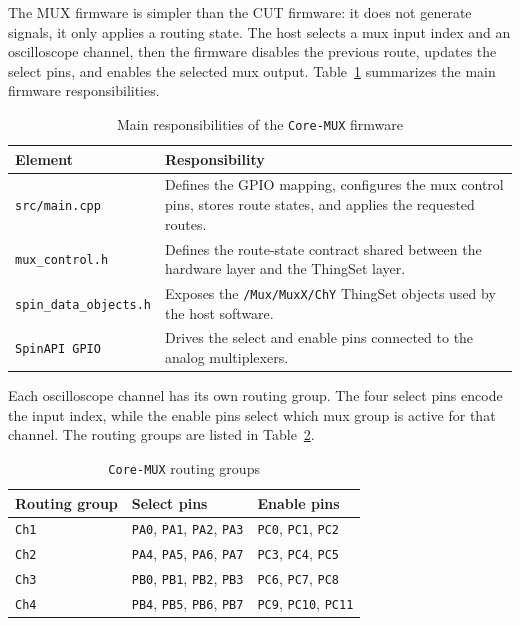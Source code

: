 The MUX firmware is simpler than the CUT firmware: it does
not generate signals, it only applies a routing state. The host selects a
mux input index and an oscilloscope channel, then the firmware disables
the previous route, updates the select pins, and enables the selected
mux output. Table~\ref{tab:core_mux_responsibilities} summarizes the
main firmware responsibilities.

\begin{table}[H]
\centering
\caption{Main responsibilities of the \texttt{Core-MUX} firmware}
\label{tab:core_mux_responsibilities}
\small
\begin{tabularx}{\textwidth}{|p{4.5cm}|X|}
\hline
\textbf{Element} & \textbf{Responsibility} \\ \hline
\texttt{src/main.cpp} & Defines the GPIO mapping, configures the mux control pins, stores route states, and applies the requested routes. \\ \hline
\texttt{mux\_control.h} & Defines the route-state contract shared between the hardware layer and the ThingSet layer. \\ \hline
\texttt{spin\_data\_objects.h} & Exposes the \texttt{/Mux/MuxX/ChY} ThingSet objects used by the host software. \\ \hline
\texttt{SpinAPI GPIO} & Drives the select and enable pins connected to the analog multiplexers. \\ \hline
\end{tabularx}
\normalsize
\end{table}

Each oscilloscope channel has its own routing group. The four select
pins encode the input index, while the enable pins select which mux
group is active for that channel. The routing groups are listed in
Table~\ref{tab:core_mux_routing_groups}.

\begin{table}[H]
\centering
\caption{\texttt{Core-MUX} routing groups}
\label{tab:core_mux_routing_groups}
\small
\begin{tabularx}{\textwidth}{|X|X|X|}
\hline
\textbf{Routing group} & \textbf{Select pins} & \textbf{Enable pins} \\ \hline
\texttt{Ch1} & \texttt{PA0}, \texttt{PA1}, \texttt{PA2}, \texttt{PA3} & \texttt{PC0}, \texttt{PC1}, \texttt{PC2} \\ \hline
\texttt{Ch2} & \texttt{PA4}, \texttt{PA5}, \texttt{PA6}, \texttt{PA7} & \texttt{PC3}, \texttt{PC4}, \texttt{PC5} \\ \hline
\texttt{Ch3} & \texttt{PB0}, \texttt{PB1}, \texttt{PB2}, \texttt{PB3} & \texttt{PC6}, \texttt{PC7}, \texttt{PC8} \\ \hline
\texttt{Ch4} & \texttt{PB4}, \texttt{PB5}, \texttt{PB6}, \texttt{PB7} & \texttt{PC9}, \texttt{PC10}, \texttt{PC11} \\ \hline
\end{tabularx}
\normalsize
\end{table}

